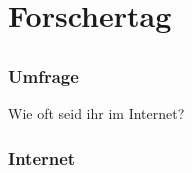 \documentclass[12pt]{beamer}
\begin{document}
\section{Forschertag}
\subsection{}

\begin{frame}
  \frametitle{Umfrage}
  \begin{center}
    \huge Wie oft seid ihr im Internet?
  \end{center}
\end{frame}

\begin{frame}
  \frametitle{Internet}
  \begin{center}

\end{center}
\end{frame}
\end{document}
